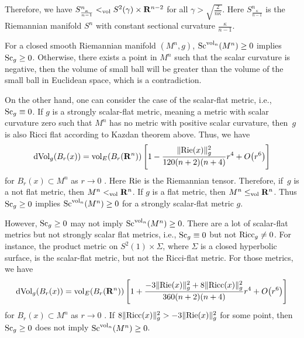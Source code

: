 \documentclass[10pt,a4paper]{amsart}
\begin{document}
Therefore, we have $S^n_{\frac{\kappa}{n-1}}<_{\rm vol} S^2(\gamma)\times \mathbf{R}^{n-2}$ for all $\gamma>\sqrt{\frac{2}{n\kappa}}$. Here $S^n_{\frac{\kappa}{n-1}}$ is the Riemannian manifold $S^n$ with constant sectional curvature $\frac{\kappa}{n-1}$.

\begin{Remark}For a closed smooth Riemannian manifold $(M^n,g)$, ${\rm Sc}^{{\rm vol}_n}(M^n)\geq 0 $ implies ${\rm Sc}_g\geq 0$. Otherwise, there exists a point in $M^n$ such that the scalar curvature is negative, then the volume of small ball will be greater than the volume of the small ball in Euclidean space, which is a contradiction.

On the other hand, one can consider the case of the scalar-flat metric, i.e., ${\rm Sc}_g\equiv 0$. If $g$ is a strongly scalar-flat metric, meaning a metric with scalar curvature zero such that $M^n$ has no metric with positive scalar curvature, then~$g$ is also Ricci flat according to Kazdan theorem above. Thus, we have
 \begin{gather*}
 {\rm dVol}_g(B_r(x)) = {\rm vol}_E(B_r(\mathbf{R}^n))\left[1 - \frac{\|{\rm Rie}(x)\|^2_g}{120(n+2)(n+4)} r^4 + O\big(r^6\big)\right]
 \end{gather*}
 for $B_r(x) \subset M^n$ as $r\to 0$ {\rm \cite[Theorem~3.3]{MR521460}}. Here ${\rm Rie}$ is the Riemannian tensor. Therefore, if~$g$ is a not flat metric, then $M^n<_{\rm vol} \mathbf{R}^n$. If $g$ is a flat metric, then $M^n\leq_{\rm vol} \mathbf{R}^n$. Thus ${\rm Sc}_g\geq 0$ implies ${\rm Sc}^{{\rm vol}_n}(M^n)\geq 0 $ for a strongly scalar-flat metric $g$.

 However, ${\rm Sc}_g\geq 0$ may not imply ${\rm Sc}^{{\rm vol}_n}(M^n)\geq 0$. There are a lot of scalar-flat metrics but not strongly scalar flat metrics, i.e., ${\rm Sc}_g\equiv 0$ but not ${\rm Ricc}_g\neq 0$. For instance, the product metric on $S^2(1)\times \Sigma$, where $\Sigma$ is a closed hyperbolic surface, is the scalar-flat metric, but not the Ricci-flat metric. For those metrics, we have
 \begin{gather*}
 {\rm dVol}_g(B_r(x)) = {\rm vol}_E(B_r(\mathbf{R}^n))\left[1 + \frac{-3\|{\rm Rie}(x)\|^2_g+8\|{\rm Ricc}(x)\|^2_g}{360(n+2)(n+4)} r^4 + O\big(r^6\big)\right]
 \end{gather*}
 for $B_r(x) \subset M^n$ as $r\to 0$ {\rm \cite[Theorem~3.3]{MR521460}}. If $8\|{\rm Ricc}(x)\|^2_g>-3\|{\rm Rie}(x)\|^2_g$ for some point, then ${\rm Sc}_g\geq 0$ does not imply ${\rm Sc}^{{\rm vol}_n}(M^n)\geq 0$.
\end{Remark}
\end{document}
